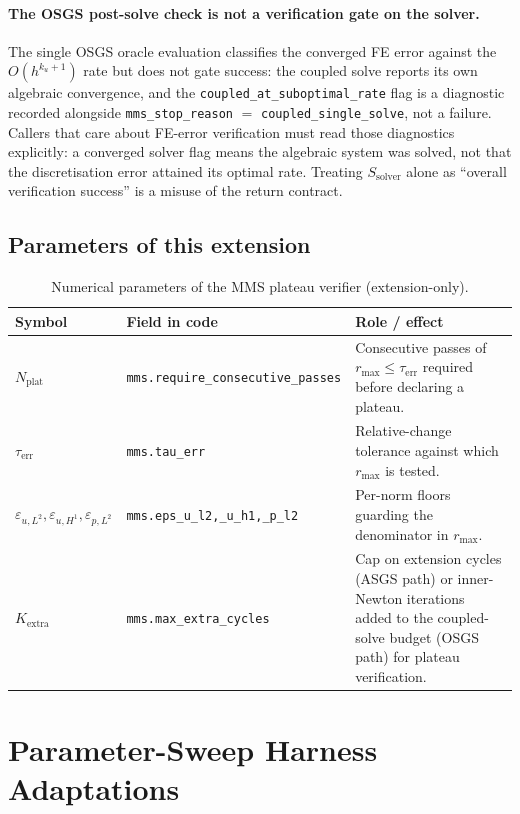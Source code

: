 \documentclass{article}
\newcommand{\code}[1]{\texttt{\small #1}}
\newcommand{\extline}[1]{{\color{extcolor}#1}}
\begin{document}
\extline{\paragraph{The OSGS post-solve check is not a verification gate
on the solver.} The single OSGS oracle evaluation classifies the
converged FE error against the $O(h^{k_u+1})$ rate but does not gate
success: the coupled solve reports its own algebraic convergence, and the
\code{coupled\_at\_suboptimal\_rate} flag is a diagnostic recorded
alongside \code{mms\_stop\_reason} $=$ \code{coupled\_single\_solve}, not
a failure. Callers that care about FE-error verification must read those
diagnostics explicitly: a converged solver flag means the algebraic
system was solved, not that the discretisation error attained its optimal
rate. Treating $S_{\mathrm{solver}}$ alone as ``overall verification
success'' is a misuse of the return contract.}

\subsection{Parameters of this extension}

\begin{table}[h]
\centering
\caption{\extline{Numerical parameters of the MMS plateau verifier (extension-only).}}
\label{tab:mms-params}
\footnotesize
\textcolor{extcolor}{%
\begin{tabularx}{\textwidth}{@{} l l X @{}}
\toprule
\textbf{Symbol} & \textbf{Field in code} & \textbf{Role / effect} \\
\midrule
$N_{\mathrm{plat}}$ & \code{mms.require\_consecutive\_passes} & Consecutive passes of $r_{\max} \le \tau_{\mathrm{err}}$ required before declaring a plateau. \\
$\tau_{\mathrm{err}}$ & \code{mms.tau\_err} & Relative-change tolerance against which $r_{\max}$ is tested. \\
$\varepsilon_{u,L^2}, \varepsilon_{u,H^1}, \varepsilon_{p,L^2}$ & \code{mms.eps\_u\_l2,\_u\_h1,\_p\_l2} & Per-norm floors guarding the denominator in $r_{\max}$. \\
$K_{\mathrm{extra}}$ & \code{mms.max\_extra\_cycles} & Cap on extension cycles (ASGS path) or inner-Newton iterations added to the coupled-solve budget (OSGS path) for plateau verification. \\
\bottomrule
\end{tabularx}}
\end{table}

\section{Parameter-Sweep Harness Adaptations}
\label{sec:harness}
\end{document}
